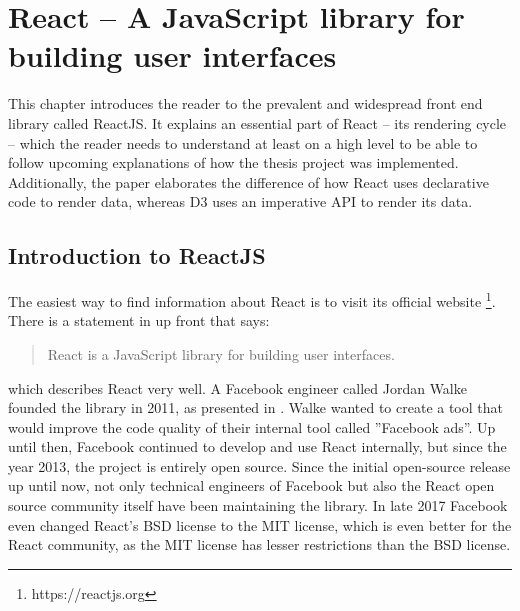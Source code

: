 \chapter{React – A JavaScript library for building user interfaces}
\label{cha:react}

This chapter introduces the reader to the prevalent and widespread front end library called ReactJS. It explains an essential part of React -- its rendering cycle -- which the reader needs to understand at least on a high level to be able to follow upcoming explanations of how the thesis project was implemented. Additionally, the paper elaborates the difference of how React uses declarative code to render data, whereas D3 uses an imperative API to render its data.

\section{Introduction to ReactJS}
\label{sec:reactIntro}

The easiest way to find information about React is to visit its official website \footnote{https://reactjs.org}. There is a statement in \cite{React} up front that says: \begin{quote}\begin{english}React is a JavaScript library for building user interfaces.\end{english}\end{quote} which describes React very well. A Facebook engineer called Jordan Walke founded the library in 2011, as presented in \cite[05:30]{ReactFoundingVideo}. Walke wanted to create a tool that would improve the code quality of their internal tool called ''Facebook ads''. Up until then, Facebook continued to develop and use React internally, but since the year 2013, the project is entirely open source. Since the initial open-source release up until now, not only technical engineers of Facebook but also the React open source community itself have been maintaining the library. In late 2017 Facebook even changed React's BSD license to the MIT license, which is even better for the React community, as the MIT license has lesser restrictions than the BSD license.

